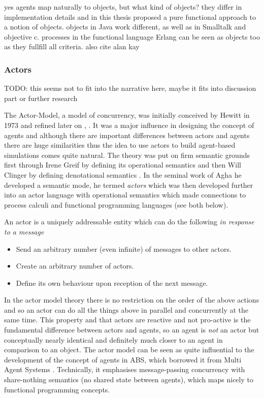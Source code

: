 yes agents map naturally to objects, but what kind of objects? they differ in implementation details and in this thesis proposed a pure functional approach to a notion of objects. objects in Java work different, as well as in Smalltalk and objective c. processes in the functional language Erlang can be seen as objects too as they fullfill all criteria. also cite alan kay

\subsubsection{Actors}
\label{sec:actors}
TODO: this seems not to fit into the narrative here, maybe it fits into discussion part or further research

The Actor-Model, a model of concurrency, was initially conceived by Hewitt in 1973 \cite{hewitt_universal_1973} and refined later on \cite{hewitt_what_2007}, \cite{hewitt_actor_2010}. It was a major influence in designing the concept of agents and although there are important differences between actors and agents there are huge similarities thus the idea to use actors to build agent-based simulations comes quite natural. The theory was put on firm semantic grounds first through Irene Greif by defining its operational semantics \cite{grief_semantics_1975} and then Will Clinger by defining denotational semantics \cite{clinger_foundations_1981}. In the seminal work of Agha \cite{agha_actors:_1986} he developed a semantic mode, he termed \textit{actors} which was then developed further \cite{agha_foundation_1997} into an actor language with operational semantics which made connections to process calculi and functional programming languages (see both below). 

An actor is a uniquely addressable entity which can do the following \textit{in response to a message}
\begin{itemize}
	\item Send an arbitrary number (even infinite) of messages to other actors.
	\item Create an arbitrary number of actors.
	\item Define its own behaviour upon reception of the next message.
\end{itemize}

In the actor model theory there is no restriction on the order of the above actions and so an actor can do all the things above in parallel and concurrently at the same time. This property and that actors are reactive and not pro-active is the fundamental difference between actors and agents, so an agent is \textit{not} an actor but conceptually nearly identical and definitely much closer to an agent in comparison to an object. The actor model can be seen as quite influential to the development of the concept of agents in ABS, which borrowed it from Multi Agent Systems \cite{wooldridge_introduction_2009}. Technically, it emphasises message-passing concurrency with share-nothing semantics (no shared state between agents), which maps nicely to functional programming concepts.

